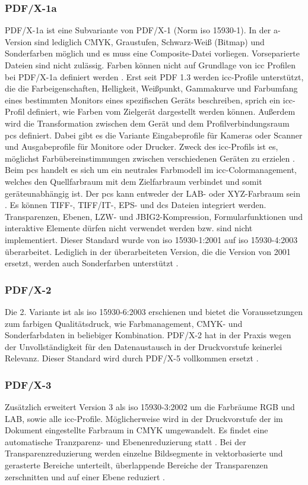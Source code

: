 \subsubsection{PDF/X-1a}
PDF/X-1a ist eine Subvariante von PDF/X-1 (Norm \gls{iso} 15930-1). In der a-Version sind lediglich CMYK, Graustufen, Schwarz-Weiß (Bitmap) und Sonderfarben möglich und es muss eine Composite-Datei vorliegen. Vorseparierte Dateien sind nicht zulässig. Farben können nicht auf Grundlage von \gls{icc} Profilen bei PDF/X-1a definiert werden \cite{adobe-pdf-x, schneeberger}. Erst seit PDF 1.3 werden \gls{icc}-Profile unterstützt, die die Farbeigenschaften, Helligkeit, Weißpunkt, Gammakurve und Farbumfang eines bestimmten Monitors eines spezifischen Geräts beschreiben, sprich ein \gls{icc}-Profil definiert, wie Farben vom Zielgerät dargestellt werden können. Außerdem wird die Transformation zwischen dem Gerät und dem Profilverbindungsraum \gls{pcs} definiert. Dabei gibt es die Variante Eingabeprofile für Kameras oder Scanner und Ausgabeprofile für Monitore oder Drucker. Zweck des \gls{icc}-Profils ist es, möglichst Farbübereinstimmungen zwischen verschiedenen Geräten zu erzielen \cite{benq}. Beim \gls{pcs} handelt es sich um ein neutrales Farbmodell im \gls{icc}-Colormanagement, welches den Quellfarbraum mit dem Zielfarbraum verbindet und somit geräteunabhängig ist. Der \gls{pcs} kann entweder der LAB- oder XYZ-Farbraum sein \cite{prepress}. Es können  TIFF-, TIFF/IT-, EPS- und \gls{dcs} Dateien integriert werden. Transparenzen, Ebenen, LZW- und JBIG2-Kompression, Formularfunktionen und interaktive Elemente dürfen nicht verwendet werden bzw. sind nicht implementiert. Dieser Standard wurde von \gls{iso} 15930-1:2001 auf \gls{iso} 15930-4:2003 überarbeitet. Lediglich in der überarbeiteten Version, die die Version von 2001 ersetzt, werden auch Sonderfarben unterstützt \cite{proj-consult, schneeberger}. 

\subsubsection{PDF/X-2}
Die 2. Variante ist als \gls{iso} 15930-6:2003 erschienen und bietet die Voraussetzungen zum farbigen Qualitätsdruck, wie Farbmanagement, CMYK- und Sonderfarbdaten in beliebiger Kombination. PDF/X-2 hat in der Praxis wegen der Unvollständigkeit für den Datenaustausch in der Druckvorstufe keinerlei Relevanz. Dieser Standard wird durch PDF/X-5 vollkommen ersetzt \cite{proj-consult, schneeberger}. 

\subsubsection{PDF/X-3}
Zusätzlich erweitert Version 3 als \gls{iso} 15930-3:2002 \cite{proj-consult} um die Farbräume RGB und LAB, sowie alle \gls{icc}-Profile. Möglicherweise wird in der Druckvorstufe der im Dokument eingestellte Farbraum in CMYK umgewandelt. Es findet eine automatische Tranzparenz- und Ebenenreduzierung statt \cite{adobe-pdf-x}. Bei der Transparenzreduzierung werden einzelne Bildsegmente in vektorbasierte und gerasterte Bereiche unterteilt, überlappende Bereiche der Transparenzen zerschnitten und auf einer Ebene reduziert \cite{adobe-transp, primus}.

